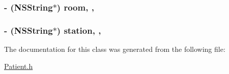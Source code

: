 \subsubsection[{room}]{\setlength{\rightskip}{0pt plus 5cm}-\/ (N\+S\+String$\ast$) room\hspace{0.3cm}{\ttfamily [read]}, {\ttfamily [write]}, {\ttfamily [atomic]}}\label{interface_patient_abf34f6869c235daf2d5df9d6e11897ec}
\hypertarget{interface_patient_a0fbfb795f61127043a26b5376914ddf5}{}
\subsubsection[{station}]{\setlength{\rightskip}{0pt plus 5cm}-\/ (N\+S\+String$\ast$) station\hspace{0.3cm}{\ttfamily [read]}, {\ttfamily [write]}, {\ttfamily [atomic]}}\label{interface_patient_a0fbfb795f61127043a26b5376914ddf5}


The documentation for this class was generated from the following file\+:\begin{DoxyCompactItemize}
\item 
\hyperlink{_patient_8h}{Patient.\+h}\end{DoxyCompactItemize}
